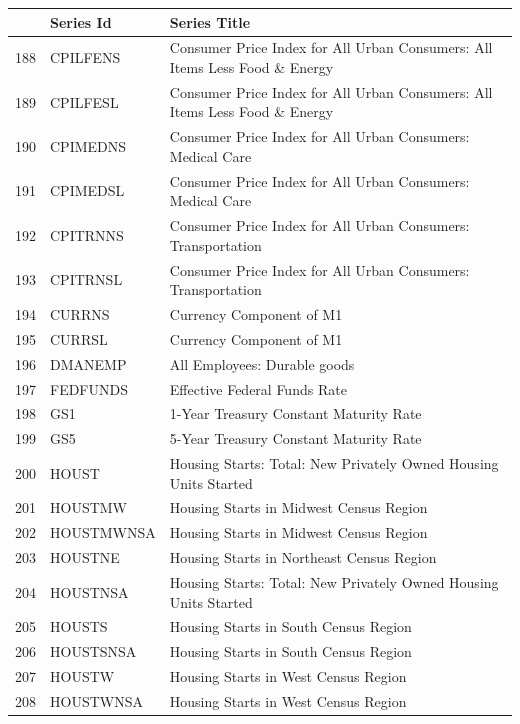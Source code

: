 \documentclass[11pt]{article}
\begin{document}
\begin{table}
\centering
\begin{tabular}{rp{5cm}p{11cm}}
	& \textbf{Series Id} & \textbf{Series Title} \\
  \hline
  \hline
	188 & CPILFENS & Consumer Price Index for All Urban Consumers: All Items Less Food \& Energy \\
  \hline
	189 & CPILFESL & Consumer Price Index for All Urban Consumers: All Items Less Food \& Energy \\
  \hline
	190 & CPIMEDNS & Consumer Price Index for All Urban Consumers: Medical Care \\
  \hline
	191 & CPIMEDSL & Consumer Price Index for All Urban Consumers: Medical Care \\
  \hline
	192 & CPITRNNS & Consumer Price Index for All Urban Consumers: Transportation \\
  \hline
	193 & CPITRNSL & Consumer Price Index for All Urban Consumers: Transportation \\
  \hline
	194 & CURRNS & Currency Component of M1 \\
  \hline
	195 & CURRSL & Currency Component of M1 \\
  \hline
	196 & DMANEMP & All Employees: Durable goods \\
  \hline
	197 & FEDFUNDS & Effective Federal Funds Rate \\
  \hline
	198 & GS1 & 1-Year Treasury Constant Maturity Rate \\
  \hline
	199 & GS5 & 5-Year Treasury Constant Maturity Rate \\
  \hline
	200 & HOUST & Housing Starts: Total: New Privately Owned Housing Units Started \\
  \hline
	201 & HOUSTMW & Housing Starts in Midwest Census Region \\
  \hline
	202 & HOUSTMWNSA & Housing Starts in Midwest Census Region \\
  \hline
	203 & HOUSTNE & Housing Starts in Northeast Census Region \\
  \hline
	204 & HOUSTNSA & Housing Starts: Total: New Privately Owned Housing Units Started \\
  \hline
	205 & HOUSTS & Housing Starts in South Census Region \\
  \hline
	206 & HOUSTSNSA & Housing Starts in South Census Region \\
  \hline
	207 & HOUSTW & Housing Starts in West Census Region \\
  \hline
	208 & HOUSTWNSA & Housing Starts in West Census Region \\

\end{tabular}
\end{table}
\end{document}
